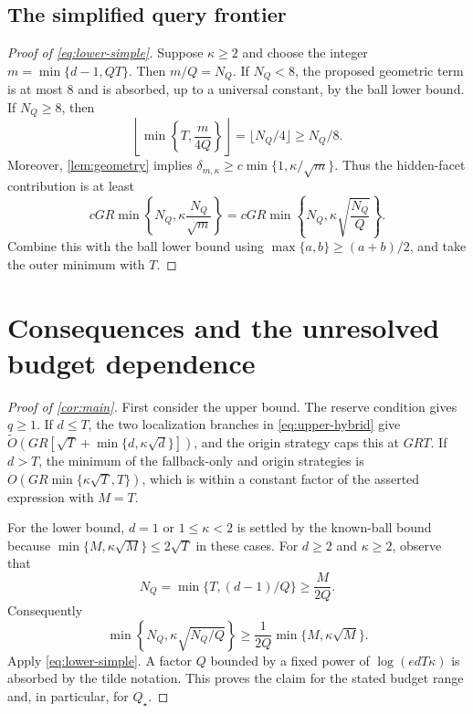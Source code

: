 \documentclass[11pt]{article}
\newcommand{\wtO}{\widetilde O}
\theoremstyle{definition}
\begin{document}
\subsection{The simplified query frontier}

\begin{proof}[Proof of \eqref{eq:lower-simple}]
Suppose $\kappa\ge2$ and choose the integer
$m=\min\{d-1,QT\}$. Then $m/Q=N_Q$.
If $N_Q<8$, the proposed geometric term is at most $8$ and is absorbed,
up to a universal constant, by the ball lower bound.
If $N_Q\ge8$, then
\[
 \left\lfloor\min\left\{T,\frac{m}{4Q}\right\}\right\rfloor
 =\lfloor N_Q/4\rfloor\ge N_Q/8.
\]
Moreover, \cref{lem:geometry} implies
$\delta_{m,\kappa}\ge c\min\{1,\kappa/\sqrt m\}$.
Thus the hidden-facet contribution is at least
\[
 cGR\min\left\{N_Q,\kappa\frac{N_Q}{\sqrt m}\right\}
 =cGR\min\left\{N_Q,\kappa\sqrt{\frac{N_Q}{Q}}\right\}.
\]
Combine this with the ball lower bound using
$\max\{a,b\}\ge(a+b)/2$, and take the outer minimum with $T$.
\end{proof}

\section{Consequences and the unresolved budget dependence}\label{sec:consequences}

\begin{proof}[Proof of \cref{cor:main}]
First consider the upper bound. The reserve condition gives $q\ge1$.
If $d\le T$, the two localization branches in
\eqref{eq:upper-hybrid} give
$\wtO(GR[\sqrt T+\min\{d,\kappa\sqrt d\}])$, and the origin strategy
caps this at $GRT$. If $d>T$, the minimum of the fallback-only and origin
strategies is $O(GR\min\{\kappa\sqrt T,T\})$, which is within a constant
factor of the asserted expression with $M=T$.

For the lower bound, $d=1$ or $1\le\kappa<2$ is settled by the known-ball
bound because $\min\{M,\kappa\sqrt M\}\le2\sqrt T$ in these cases.
For $d\ge2$ and $\kappa\ge2$, observe that
\[
 N_Q=\min\{T,(d-1)/Q\}\ge\frac{M}{2Q}.
\]
Consequently
\[
 \min\left\{N_Q,\kappa\sqrt{N_Q/Q}\right\}
 \ge\frac1{2Q}\min\{M,\kappa\sqrt M\}.
\]
Apply \eqref{eq:lower-simple}. A factor $Q$ bounded by a fixed power of
$\log(edT\kappa)$ is absorbed by the tilde notation. This proves the
claim for the stated budget range and, in particular, for $Q_\star$.
\end{proof}
\end{document}
